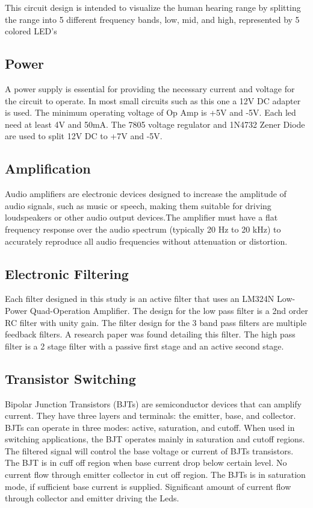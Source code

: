 \documentclass[12pt,a4paper]{article}
\begin{document}
    This circuit design is intended to visualize the human hearing range by splitting the range into 5 different frequency bands, low, mid, and high, represented by 5 colored LED's

    \subsection*{\fontsize{10}{11}\selectfont Power}
     A power supply is essential for providing the necessary current and voltage for the circuit to operate. In most small circuits such as this one a 12V DC adapter is used. The minimum operating voltage of Op Amp is +5V and -5V. Each led need at least 4V and 50mA.  The 7805 voltage regulator and 1N4732 Zener Diode are used to split 12V DC to +7V and  -5V.
     
    
     
    \subsection*{\fontsize{10}{11}\selectfont Amplification}
    Audio amplifiers are electronic devices designed to increase the amplitude of audio signals, such as music or speech, making them suitable for driving loudspeakers or other audio output devices.The amplifier must have a flat frequency response over the audio spectrum (typically 20 Hz to 20 kHz) to accurately reproduce all audio frequencies without attenuation or distortion.
    \newpage
    \subsection*{\fontsize{10}{11}\selectfont Electronic Filtering}
        Each filter designed in this study is an active filter that uses an LM324N Low-Power Quad-Operation Amplifier. The design for the low pass filter is a 2nd order RC filter with unity gain. The filter design for the 3 band pass filters are multiple feedback filters. A research paper was found detailing this filter. The high pass filter is a 2 stage filter with a passive first stage and an active second stage.
        
    \subsection*{\fontsize{10}{11}\selectfont Transistor Switching}
    Bipolar Junction Transistors (BJTs) are semiconductor devices that can amplify current. They have three layers and terminals: the emitter, base, and collector. BJTs can operate in three modes: active, saturation, and cutoff. When used in switching applications, the BJT operates mainly in saturation and cutoff regions. The filtered signal will control the base voltage or current of BJTs transistors. The BJT is in cuff off region when base current drop below certain level. No current flow through emitter collector in cut off region. The BJTs is in saturation mode, if sufficient base current is supplied. Significant amount of current flow through collector and emitter driving the Leds. 
\end{document}
